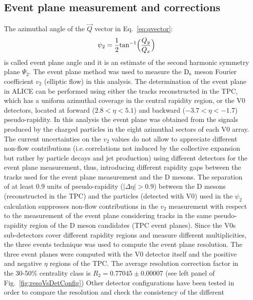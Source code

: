 \subsection{Event plane measurement and corrections}
The azimuthal angle of the $\vec{Q}$ vector in Eq.~\ref{eq:qvector}:
\begin{equation}
\label{eq:psi2}
\psi_2= \frac{1}{2} {\rm tan}^{-1} \Big (\frac{Q_y}{Q_x} \Big )
\end{equation}
is called event plane angle and it is an estimate of the second harmonic symmetry plane $\Psi_2$.
The event plane method was used to measure the ${\rm D_s}$ meson 
Fourier coefficient $v_2$ (elliptic flow) in this analysis.
The determination of the event plane in ALICE can be performed using
either the tracks reconstructed in the TPC, which has a uniform
azimuthal coverage in the central rapidity region, or the V0
detectors, located at forward ($2.8<\eta<5.1$) and backward
($-3.7<\eta<-1.7$) pseudo-rapidity.
In this analysis the event plane was obtained from the 
signals produced by the charged particles in the eight 
azimuthal sectors of each V0 array. 
The current uncertainties on the $v_2$ values do not allow to
appreciate different non-flow contributions (i.e.\,correlations not 
induced by the collective expansion but rather by particle decays and 
jet production) using different detectors
for the event plane measurement, thus, introducing different
rapidity gaps between the tracks used for the event plane measurement
and the D mesons. %
The separation of at least 0.9 units of pseudo-rapidity 
($|\Delta\eta|>0.9$) between the D mesons (reconstructed in the TPC)
and the particles (detected with V0) used in the $\psi_2$ calculation
suppresses non-flow contributions in the $v_2$ measurement with respect
to the measurement of the event plane considering tracks in the same
pseudo-rapidity region of the D meson candidates (TPC event planes).
Since the V0s sub-detectors cover different rapidity 
regions and measure different multiplicities, the
three events technique was used to compute the event plane resolution.
The three event planes were computed with the V0 detector itself and the 
positive and negative $\eta$ regions of the TPC.
The average resolution correction factor in the 30-50\% centrality class is
$R_2 = 0.77045 \pm 0.00007$ (see left panel 
of Fig.~\ref{fig:resoVsDetConfig}) 
Other detector 
configurations have been tested in order to compare 
the resolution and check the consistency of the different 

